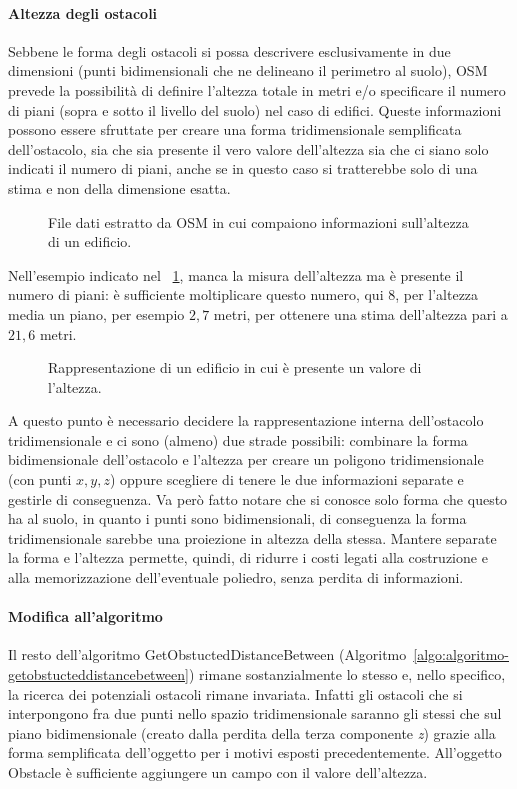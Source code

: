 \paragraph{Altezza degli ostacoli}%
Sebbene le forma degli ostacoli si possa descrivere esclusivamente in due dimensioni (punti bidimensionali che ne delineano il perimetro al suolo),
OSM prevede la possibilità di definire l'altezza totale in metri e/o specificare il numero di piani (sopra e sotto il livello del suolo)
nel caso di edifici.
Queste informazioni possono essere sfruttate per creare una forma tridimensionale semplificata dell'ostacolo,
sia che sia presente il vero valore dell'altezza sia che ci siano solo indicati il numero di piani,
anche se in questo caso si tratterebbe solo di una stima e non della dimensione esatta.
%
\begin{figure}[htbp]
	\centering
\caption{File dati estratto da OSM in cui compaiono informazioni sull'altezza di un edificio.\label{fig:esempio-pd-osm-edificio-altezza}}
\end{figure}
%
Nell'esempio indicato nel \figurename~\ref{fig:esempio-pd-osm-edificio-altezza}, manca la misura dell'altezza ma è presente
il numero di piani: è sufficiente moltiplicare questo numero, qui $8$, per l'altezza media un piano, per esempio $2,7$ metri,
per ottenere una stima dell'altezza pari a $21,6$ metri.
%
\begin{figure}[htbp]
	\centering
\caption{Rappresentazione di un edificio in cui è presente un valore di l'altezza.\label{fig:esempio-pd-poly-edificio-altezza}}
\end{figure}
%
A questo punto è necessario decidere la rappresentazione interna dell'ostacolo tridimensionale
e ci sono (almeno) due strade possibili: combinare la forma bidimensionale dell'ostacolo
e l'altezza per creare un poligono tridimensionale (con punti $x,y,z$) oppure
scegliere di tenere le due informazioni separate e gestirle di conseguenza.
Va però fatto notare che si conosce solo forma che questo ha al suolo,
in quanto i punti sono bidimensionali, di conseguenza la forma tridimensionale
sarebbe una proiezione in altezza della stessa.
Mantere separate la forma e l'altezza permette, quindi, di ridurre i costi legati
alla costruzione e alla memorizzazione dell'eventuale poliedro,
senza perdita di informazioni.
%
\paragraph{Modifica all'algoritmo}
Il resto dell'algoritmo \textsf{GetObstuctedDistanceBetween} (Algoritmo~\ref{algo:algoritmo-getobstucteddistancebetween})
rimane sostanzialmente lo stesso e, nello specifico, la ricerca dei potenziali ostacoli rimane invariata.
Infatti gli ostacoli che si interpongono fra due punti nello spazio tridimensionale saranno gli stessi che sul piano bidimensionale
(creato dalla perdita della terza componente \textit{z})
grazie alla forma semplificata dell'oggetto per i motivi esposti precedentemente.
All'oggetto \textsf{Obstacle} è sufficiente aggiungere un campo con il valore dell'altezza.

